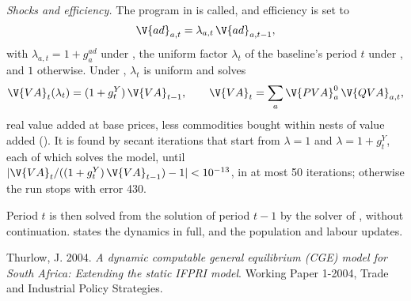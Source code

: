 \textit{Shocks and efficiency.} The program in  is called, and
efficiency is set to
\begin{equation*}
\V{ad}_{a,t} = \lambda_{a,t}\,\V{ad}_{a,t-1},
\end{equation*}
with $\lambda_{a,t} = 1 + g^{ad}_a$ under , the uniform factor
$\lambda_t$ of the baseline's period $t$ under , and $1$
otherwise. Under , $\lambda_t$ is uniform and solves
\begin{equation*}
\V{VA}_t(\lambda_t) = (1 + g^Y_t)\,\V{VA}_{t-1}, \qquad
\V{VA}_t = \sum_a \V{PVA}^0_a\,\V{QVA}_{a,t},
\end{equation*}
real value added at base prices, less commodities bought within nests of
value added (). It is found by secant iterations that
start from $\lambda = 1$ and $\lambda = 1 + g^Y_t$, each of which solves the
model, until $\lvert \V{VA}_t / ((1+g^Y_t)\,\V{VA}_{t-1}) - 1 \rvert < 10^{-13}$,
in at most 50 iterations; otherwise the run stops with error 430.

Period $t$ is then solved from the solution of period $t-1$ by the solver of
, without continuation.  states the
dynamics in full, and  the population and labour
updates.


Thurlow, J. 2004. \textit{A dynamic computable general equilibrium (CGE) model
for South Africa: Extending the static IFPRI model}. Working Paper 1-2004,
Trade and Industrial Policy Strategies.


\begin{alsosee}
\end{alsosee}
